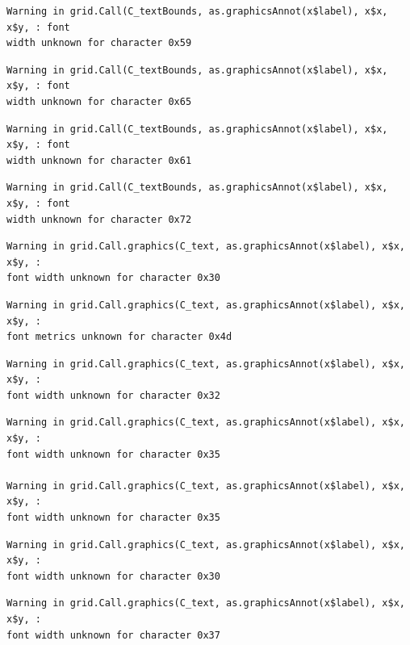 \documentclass[
  letterpaper,
  DIV=11,
  numbers=noendperiod]{scrreprt}
\begin{document}
\begin{verbatim}
Warning in grid.Call(C_textBounds, as.graphicsAnnot(x$label), x$x, x$y, : font
width unknown for character 0x59
\end{verbatim}

\begin{verbatim}
Warning in grid.Call(C_textBounds, as.graphicsAnnot(x$label), x$x, x$y, : font
width unknown for character 0x65
\end{verbatim}

\begin{verbatim}
Warning in grid.Call(C_textBounds, as.graphicsAnnot(x$label), x$x, x$y, : font
width unknown for character 0x61
\end{verbatim}

\begin{verbatim}
Warning in grid.Call(C_textBounds, as.graphicsAnnot(x$label), x$x, x$y, : font
width unknown for character 0x72
\end{verbatim}

\begin{verbatim}
Warning in grid.Call.graphics(C_text, as.graphicsAnnot(x$label), x$x, x$y, :
font width unknown for character 0x30
\end{verbatim}

\begin{verbatim}
Warning in grid.Call.graphics(C_text, as.graphicsAnnot(x$label), x$x, x$y, :
font metrics unknown for character 0x4d
\end{verbatim}

\begin{verbatim}
Warning in grid.Call.graphics(C_text, as.graphicsAnnot(x$label), x$x, x$y, :
font width unknown for character 0x32
\end{verbatim}

\begin{verbatim}
Warning in grid.Call.graphics(C_text, as.graphicsAnnot(x$label), x$x, x$y, :
font width unknown for character 0x35

Warning in grid.Call.graphics(C_text, as.graphicsAnnot(x$label), x$x, x$y, :
font width unknown for character 0x35
\end{verbatim}

\begin{verbatim}
Warning in grid.Call.graphics(C_text, as.graphicsAnnot(x$label), x$x, x$y, :
font width unknown for character 0x30
\end{verbatim}

\begin{verbatim}
Warning in grid.Call.graphics(C_text, as.graphicsAnnot(x$label), x$x, x$y, :
font width unknown for character 0x37
\end{verbatim}
\end{document}
